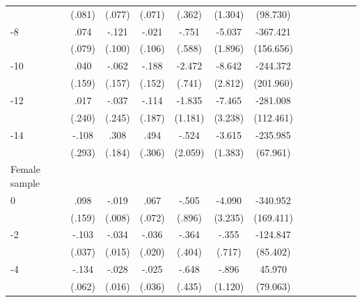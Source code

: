 \begin{table}[hp]
\begin{adjustbox}{max width=\linewidth}
\begin{threeparttable}
{\begin{tabular}{l*{6}{S S}}
                &   (.081)         &   (.077)         &   (.071)         &   (.362)         &  (1.304)         & (98.730)         \\
-8             &     .074         &    -.121         &    -.021         &    -.751         &   -5.037\sym{***}& -367.421\sym{**} \\
                &   (.079)         &   (.100)         &   (.106)         &   (.588)         &  (1.896)         &(156.656)         \\
-10            &     .040         &    -.062         &    -.188         &   -2.472\sym{***}&   -8.642\sym{***}& -244.372         \\
                &   (.159)         &   (.157)         &   (.152)         &   (.741)         &  (2.812)         &(201.960)         \\
-12           &     .017         &    -.037         &    -.114         &   -1.835         &   -7.465\sym{**} & -281.008\sym{**} \\
                &   (.240)         &   (.245)         &   (.187)         &  (1.181)         &  (3.238)         &(112.461)         \\
-14           &    -.108         &     .308\sym{*}  &     .494         &    -.524         &   -3.615\sym{***}& -235.985\sym{***}\\
                &   (.293)         &   (.184)         &   (.306)         &  (2.059)         &  (1.383)         & (67.961)         \\
\midrule
Female sample &&&&&&\\
0               &     .098         &    -.019\sym{**} &     .067         &    -.505         &   -4.090         & -340.952\sym{**} \\
                &   (.159)         &   (.008)         &   (.072)         &   (.896)         &  (3.235)         &(169.411)         \\
-2             &    -.103\sym{***}&    -.034\sym{**} &    -.036\sym{*}  &    -.364         &    -.355         & -124.847         \\
                &   (.037)         &   (.015)         &   (.020)         &   (.404)         &   (.717)         & (85.402)         \\
-4             &    -.134\sym{**} &    -.028\sym{*}  &    -.025         &    -.648         &    -.896         &   45.970         \\
                &   (.062)         &   (.016)         &   (.036)         &   (.435)         &  (1.120)         & (79.063)         \\

\end{tabular}}
\end{threeparttable}
\end{adjustbox}
\end{table}
